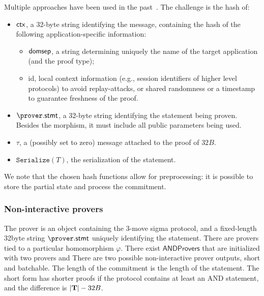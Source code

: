 \documentclass[runningheads,11pt]{article}
\newcommand{\serialize}{\texttt{Serialize}}
\newcommand{\proverstatement}{\prover.\textsf{stmt}}
\newcommand{\seedlen}{\ensuremath{32B}}
\begin{document}
Multiple approaches have been used in the past~\cite{EPRINT:Hamburg17, hash-to-curve}.
The challenge is the hash of:
\begin{itemize}
  \item $\mathsf{ctx}$, a 32-byte string identifying the message, containing the
  hash of the following application-specific information:
  \begin{itemize}
    \item $\textsf{domsep}$, a string determining uniquely the name of the target application (and the proof type);
    \item \textsf{id},
      local context information (e.g., session identifiers of higher level protocols) to avoid replay-attacks, or shared randomness or a timestamp to guarantee freshness of the proof.
  \end{itemize}
  \item $\proverstatement$, a 32-byte string identifying the statement being proven. Besides the morphism, it must include all public parameters being used.
  \item $\tau$, a (possibly set to zero) message attached to the proof of \seedlen.
  \item $\serialize(T)$, the serialization of the statement.
\end{itemize}

We note that the chosen hash functions allow for preprocessing: it is possible to store the partial state and process the commitment.



\subsubsection{Non-interactive provers}
The prover is an object containing the 3-move sigma protocol, and a fixed-length 32byte string $\proverstatement$ uniquely identifying the statement.
There are provers tied to a particular homomorphism $\varphi$.
There exist $\textsf{ANDProvers}$ that are initialized with two provers and
There are two possible non-interactive prover outputs, short and batchable.
The length of the commitment is the length of the statement.
The short form has shorter proofs if the protocol contains at least an AND statement, and the difference is $|\vec \commitment| - \seedlen$.
\end{document}
